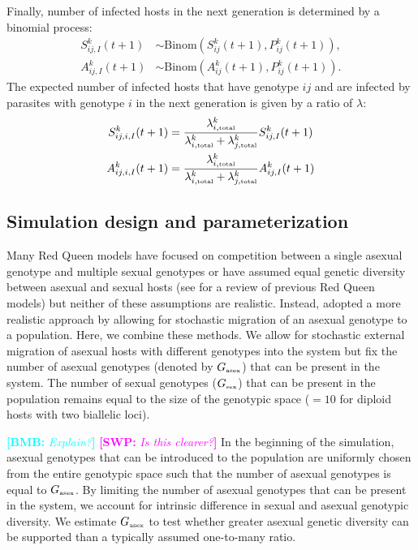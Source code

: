 \documentclass{article}\usepackage[]{graphicx}\usepackage[]{color}
\newcommand{\comment}[3]{\textcolor{#1}{\textbf{[#2: }\textit{#3}\textbf{]}}}
\newcommand{\bmb}[1]{\comment{cyan}{BMB}{#1}}
\newcommand{\swp}[1]{\comment{magenta}{SWP}{#1}}
\begin{document}
Finally, number of infected hosts in the next generation is determined by a binomial process:
\begin{equation}
\begin{aligned}
S_{ij,I}^k (t+1) &\sim \mathrm{Binom}(S_{ij}^k (t+1), P_{ij}^k(t+1)),\\
A_{ij,I}^k (t+1) &\sim \mathrm{Binom}(A_{ij}^k (t+1), P_{ij}^k(t+1)).
\end{aligned}
\end{equation}
The expected number of infected hosts that have genotype $ij$ and are infected by parasites with genotype $i$ in the next generation is given by a ratio of $\lambda$:
\begin{equation}
\begin{aligned}
S_{ij,i,I}^k(t+1) &= \frac{\lambda_{i, \textrm{\tiny total}}^k}{\lambda_{i, \textrm{\tiny total}}^k + \lambda_{j, \textrm{\tiny total}}^k} S_{ij,I}^k(t+1)\\
A_{ij,i,I}^k(t+1) &= \frac{\lambda_{i, \textrm{\tiny total}}^k}{\lambda_{i, \textrm{\tiny total}}^k + \lambda_{j, \textrm{\tiny total}}^k} A_{ij,I}^k(t+1)
\end{aligned}
\end{equation}

\subsection{Simulation design and parameterization}

Many Red Queen models have focused on competition between a single asexual genotype and multiple sexual genotypes or have assumed equal genetic diversity between asexual and sexual hosts (see \citep{ashby2015diversity} for a review of previous Red Queen models) but neither of these assumptions are realistic.
Instead, \cite{ashby2015diversity} adopted a more realistic approach by allowing for stochastic migration of an asexual genotype to a population.
Here, we combine these methods.
We allow for stochastic external migration of asexual hosts with different genotypes into the system but fix the number of asexual genotypes (denoted by $G_{\textrm{\tiny asex}}$) that can be present in the system. 
The number of sexual genotypes ($G_{\textrm{\tiny sex}}$) that can be present in the population remains equal to the size of the genotypic space ($=10$ for diploid hosts with two biallelic loci).

\bmb{Explain?}
\swp{Is this clearer?}
In the beginning of the simulation, asexual genotypes that can be introduced to the population are uniformly chosen from the entire genotypic space such that the number of asexual genotypes is equal to $G_{\textrm{\tiny asex}}$.
By limiting the number of asexual genotypes that can be present in the system, we account for intrinsic difference in sexual and asexual genotypic diversity.
We estimate $G_{\textrm{\tiny asex}}$ to test whether greater asexual genetic diversity can be supported than a typically assumed one-to-many ratio.
\end{document}
